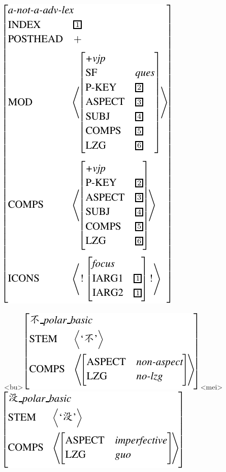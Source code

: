 \documentclass[11pt]{article}
\begin{document}
{\small 
\ex{}
\vspace{-10pt}
\newline
\includegraphics[scale=.8]{pdf/super.pdf}
\xe}
\vspace{-20pt}



{\small 
{}
\a<bu>
\vspace{-10pt}
\newline
\includegraphics[scale=.8]{pdf/bu.pdf}
\a<mei>
\vspace{-10pt}
\newline
\includegraphics[scale=.8]{pdf/mei.pdf}
\xe}
\vspace{-20pt}
\end{document}
